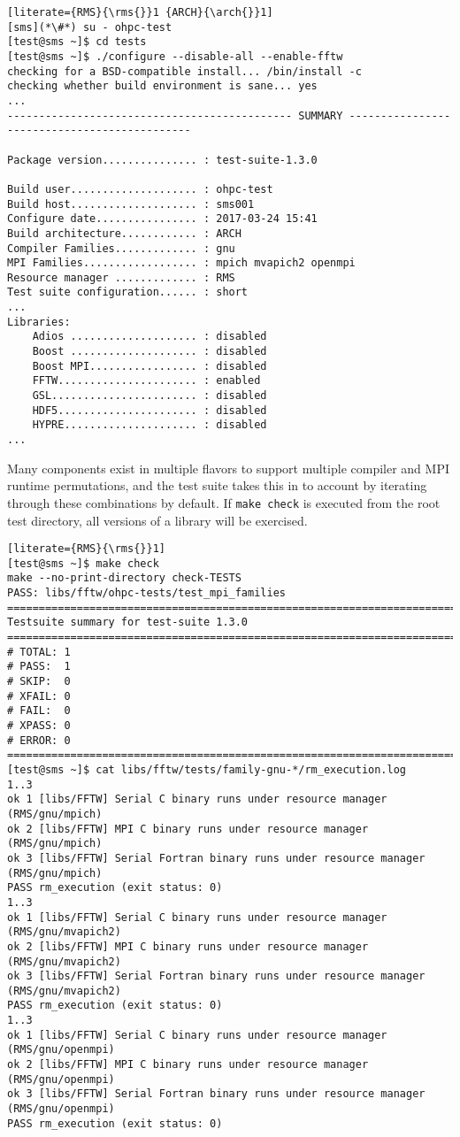 \begin{lstlisting}[literate={RMS}{\rms{}}1 {ARCH}{\arch{}}1]
[sms](*\#*) su - ohpc-test
[test@sms ~]$ cd tests
[test@sms ~]$ ./configure --disable-all --enable-fftw
checking for a BSD-compatible install... /bin/install -c
checking whether build environment is sane... yes
...
--------------------------------------------- SUMMARY ---------------------------------------------

Package version............... : test-suite-1.3.0

Build user.................... : ohpc-test
Build host.................... : sms001
Configure date................ : 2017-03-24 15:41
Build architecture............ : ARCH
Compiler Families............. : gnu
MPI Families.................. : mpich mvapich2 openmpi
Resource manager ............. : RMS
Test suite configuration...... : short
...
Libraries:
    Adios .................... : disabled
    Boost .................... : disabled
    Boost MPI................. : disabled
    FFTW...................... : enabled
    GSL....................... : disabled
    HDF5...................... : disabled
    HYPRE..................... : disabled
...
\end{lstlisting}

Many \OHPC{} components exist in multiple flavors to support multiple compiler
and MPI runtime permutations, and the test suite takes this in to account by
iterating through these combinations by default. If \texttt{make check} is executed
from the root test directory, all versions of a library will be exercised.

\begin{lstlisting}[literate={RMS}{\rms{}}1]
[test@sms ~]$ make check
make --no-print-directory check-TESTS
PASS: libs/fftw/ohpc-tests/test_mpi_families
============================================================================
Testsuite summary for test-suite 1.3.0
============================================================================
# TOTAL: 1
# PASS:  1
# SKIP:  0
# XFAIL: 0
# FAIL:  0
# XPASS: 0
# ERROR: 0
============================================================================
[test@sms ~]$ cat libs/fftw/tests/family-gnu-*/rm_execution.log 
1..3
ok 1 [libs/FFTW] Serial C binary runs under resource manager (RMS/gnu/mpich)
ok 2 [libs/FFTW] MPI C binary runs under resource manager (RMS/gnu/mpich)
ok 3 [libs/FFTW] Serial Fortran binary runs under resource manager (RMS/gnu/mpich)
PASS rm_execution (exit status: 0)
1..3
ok 1 [libs/FFTW] Serial C binary runs under resource manager (RMS/gnu/mvapich2)
ok 2 [libs/FFTW] MPI C binary runs under resource manager (RMS/gnu/mvapich2)
ok 3 [libs/FFTW] Serial Fortran binary runs under resource manager (RMS/gnu/mvapich2)
PASS rm_execution (exit status: 0)
1..3
ok 1 [libs/FFTW] Serial C binary runs under resource manager (RMS/gnu/openmpi)
ok 2 [libs/FFTW] MPI C binary runs under resource manager (RMS/gnu/openmpi)
ok 3 [libs/FFTW] Serial Fortran binary runs under resource manager (RMS/gnu/openmpi)
PASS rm_execution (exit status: 0)
\end{lstlisting}
